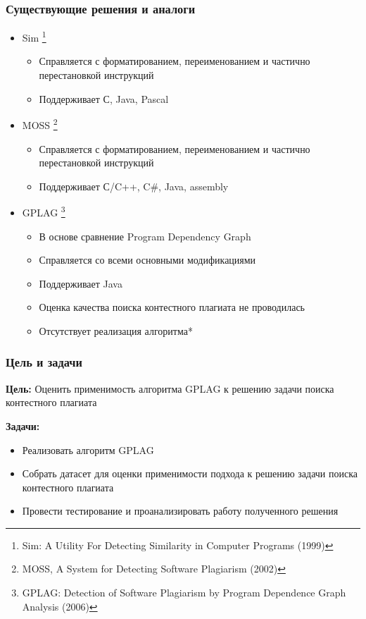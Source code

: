 \documentclass[10pt]{beamer}
\begin{document}
\begin{frame}[fragile]\frametitle{Существующие решения и аналоги}
	\begin{itemize}
		\item Sim \footnote[frame]{Sim: A Utility For Detecting Similarity in Computer Programs (1999)}
		\begin{itemize}
			\item Справляется с форматированием, переименованием и частично перестановкой инструкций
			\item Поддерживает С, Java, Pascal
		\end{itemize}
	    \item MOSS \footnote[frame]{MOSS, A System for Detecting Software Plagiarism (2002)}
	    \begin{itemize}
	    	\item Справляется с форматированием, переименованием и частично перестановкой инструкций
	    	\item Поддерживает С/C++, C#, Java, assembly
	    \end{itemize}
		\item GPLAG \footnote[frame]{GPLAG: Detection of Software Plagiarism by Program Dependence Graph Analysis (2006)}
		\begin{itemize}
			\item В основе сравнение Program Dependency Graph
			\item Справляется со всеми основными модификациями
			\item Поддерживает Java
			\item Оценка качества поиска контестного плагиата не проводилась
			\item Отсутствует реализация алгоритма*
		\end{itemize}
	\end{itemize}
\end{frame}

\begin{frame}\frametitle{Цель и задачи}
    \textbf{Цель:} Оценить применимость алгоритма GPLAG к решению задачи поиска контестного плагиата
    
    \textbf{Задачи:}
    \begin{itemize}
        \item Реализовать алгоритм GPLAG
        \item Собрать датасет для оценки применимости подхода к решению задачи поиска контестного плагиата
        \item Провести тестирование и проанализировать работу полученного решения
    \end{itemize}
\end{frame}
\end{document}
